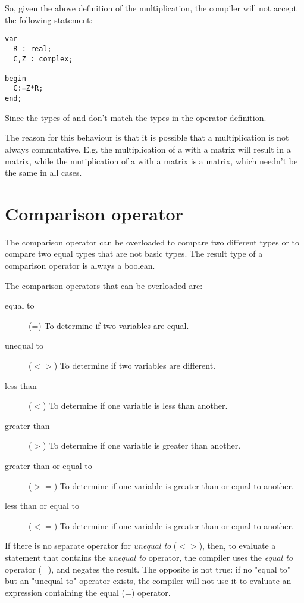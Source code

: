 So, given the above definition of the multiplication,
the compiler will not accept the following statement:
\begin{verbatim}
var
  R : real;
  C,Z : complex;

begin
  C:=Z*R;
end;
\end{verbatim}
Since the types of  and  don't match the types in the
operator definition.

The reason for this behaviour is that it is possible that a multiplication
is not always commutative. E.g. the multiplication of a  with a
 matrix will result in a  matrix, while the
mutiplication of a  with a  matrix is a 
matrix, which needn't be the same in all cases.

\section{Comparison operator}
The comparison operator can be overloaded to compare two different types
or to compare two equal types that are not basic types. The result type of
a comparison operator is always a boolean.

The comparison operators that can be overloaded are:
\begin{description}
\item[equal to] (=) To determine if two variables are equal.
\item[unequal to] ($<>$) To determine if two variables are different.
\item[less than] ($<$) To determine if one variable is less than another.
\item[greater than] ($>$) To determine if one variable is greater than another.
\item[greater than or equal to] ($>=$) To determine if one variable is greater than
or equal to another.
\item[less than or equal to] ($<=$) To determine if one variable is greater
than or equal to another.
\end{description}

If there is no separate operator for {\em unequal to} ($<>$), then, to evaluate a
statement that contains the {\em unequal to} operator, the compiler uses the
{\em equal to} operator (=), and negates the result. The opposite is not
true: if no "equal to" but an "unequal to" operator exists, the compiler
will not use it to evaluate an expression containing the equal (=) operator. 

